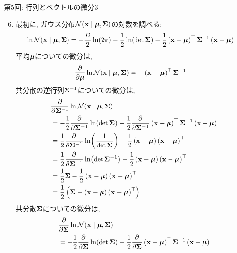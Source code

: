 \documentclass[dvipdfmx,notheorems,t]{beamer}
\begin{document}
\begin{frame}{第5回: 行列とベクトルの微分3}
\begin{enumerate}
  \setcounter{enumi}{5}
  \item 最初に, ガウス分布$\mathcal{N}(\vb{x} \mid \vb*{\mu}, \vb{\Sigma})$の対数を調べる:
  \begin{align*}
    \ln \mathcal{N}(\vb{x} \mid \vb*{\mu}, \vb{\Sigma})
    &= -\frac{D}{2} \ln(2\pi) - \frac{1}{2} \ln(\det \vb{\Sigma})
      - \frac{1}{2} \left( \vb{x} - \vb*{\mu} \right)^\top \vb{\Sigma}^{-1}
        \left( \vb{x} - \vb*{\mu} \right)
  \end{align*}
  平均$\vb*{\mu}$についての微分は,
  \begin{align*}
    \pdv{\vb*{\mu}} \ln \mathcal{N}(\vb{x} \mid \vb*{\mu}, \vb{\Sigma})
    &= -\left( \vb{x} - \vb*{\mu} \right)^\top \vb{\Sigma}^{-1}
  \end{align*}
  \newpage
  共分散の逆行列$\vb{\Sigma}^{-1}$についての微分は,
  \begin{align*}
    & \pdv{\vb{\Sigma}^{-1}} \ln \mathcal{N}(\vb{x} \mid \vb*{\mu}, \vb{\Sigma}) \\
    &= -\frac{1}{2} \pdv{\vb{\Sigma}^{-1}} \ln(\det \vb{\Sigma})
      - \frac{1}{2} \pdv{\vb{\Sigma}^{-1}}
      \left( \vb{x} - \vb*{\mu} \right)^\top \vb{\Sigma}^{-1}
      \left( \vb{x} - \vb*{\mu} \right) \\
    &= \frac{1}{2} \pdv{\vb{\Sigma}^{-1}} \ln(\frac{1}{\det \vb{\Sigma}})
      - \frac{1}{2} \left( \vb{x} - \vb*{\mu} \right) \left( \vb{x} - \vb*{\mu} \right)^\top \\
    &= \frac{1}{2} \pdv{\vb{\Sigma}^{-1}} \ln(\det \vb{\Sigma}^{-1})
      - \frac{1}{2} \left( \vb{x} - \vb*{\mu} \right) \left( \vb{x} - \vb*{\mu} \right)^\top \\
    &= \frac{1}{2} \vb{\Sigma}
      - \frac{1}{2} \left( \vb{x} - \vb*{\mu} \right) \left( \vb{x} - \vb*{\mu} \right)^\top \\
    &= \frac{1}{2} \left( \vb{\Sigma}
      - \left( \vb{x} - \vb*{\mu} \right) \left( \vb{x} - \vb*{\mu} \right)^\top \right)
  \end{align*}
  \newpage
  共分散$\vb{\Sigma}$についての微分は,
  \begin{align*}
    & \pdv{\vb{\Sigma}} \ln \mathcal{N}(\vb{x} \mid \vb*{\mu}, \vb{\Sigma}) \\
    &= -\frac{1}{2} \pdv{\vb{\Sigma}} \ln(\det \vb{\Sigma}) - \frac{1}{2} \pdv{\vb{\Sigma}}
      \left( \vb{x} - \vb*{\mu} \right)^\top \vb{\Sigma}^{-1}
      \left( \vb{x} - \vb*{\mu} \right) \\

\end{align*}
\end{enumerate}
\end{frame}
\end{document}
